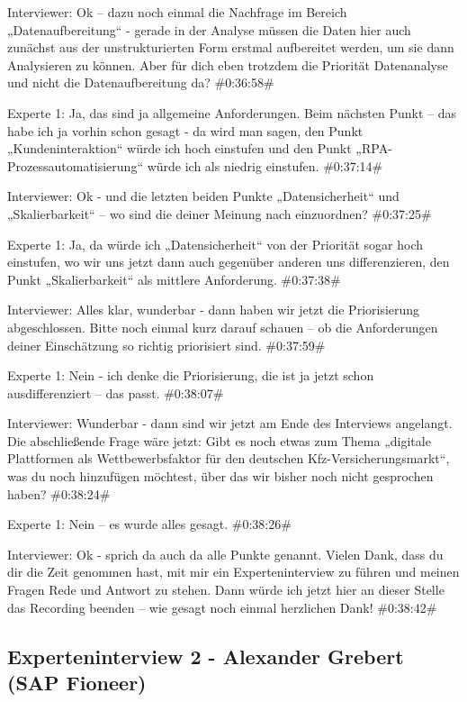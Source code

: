 Interviewer:
Ok – dazu noch einmal die Nachfrage im Bereich „Datenaufbereitung“ - gerade in der Analyse müssen die Daten hier auch zunächst aus der unstrukturierten Form erstmal aufbereitet werden, um sie dann Analysieren zu können. Aber für dich eben trotzdem die Priorität Datenanalyse und nicht die Datenaufbereitung da?
\#0:36:58\#

Experte 1:
Ja, das sind ja allgemeine Anforderungen. Beim nächsten Punkt – das habe ich ja vorhin schon gesagt - da wird man sagen, den Punkt „Kundeninteraktion“ würde ich hoch einstufen und den Punkt „RPA-Prozessautomatisierung“ würde ich als niedrig einstufen.
\#0:37:14\#

Interviewer:
Ok - und die letzten beiden Punkte „Datensicherheit“ und „Skalierbarkeit“ – wo sind die deiner Meinung nach einzuordnen?
\#0:37:25\#

Experte 1:
Ja, da würde ich „Datensicherheit“ von der Priorität sogar hoch einstufen, wo wir uns jetzt dann auch gegenüber anderen uns differenzieren, den Punkt „Skalierbarkeit“ als mittlere Anforderung.
\#0:37:38\#

Interviewer:
Alles klar, wunderbar - dann haben wir jetzt die Priorisierung abgeschlossen. Bitte noch einmal kurz darauf schauen – ob die Anforderungen deiner Einschätzung so richtig priorisiert sind.
\#0:37:59\#

Experte 1:
Nein - ich denke die Priorisierung, die ist ja jetzt schon ausdifferenziert – das passt.
\#0:38:07\#

Interviewer:
Wunderbar - dann sind wir jetzt am Ende des Interviews angelangt. Die abschließende Frage wäre jetzt: Gibt es noch etwas zum Thema „digitale Plattformen als Wettbewerbsfaktor für den deutschen Kfz-Versicherungsmarkt“, was du noch hinzufügen möchtest, über das wir bisher noch nicht gesprochen haben?
\#0:38:24\#

Experte 1:
Nein – es wurde alles gesagt.
\#0:38:26\#

Interviewer:
Ok -  sprich da auch da alle Punkte genannt. Vielen Dank, dass du dir die Zeit genommen hast, mit mir ein Experteninterview zu führen und meinen Fragen Rede und Antwort zu stehen. Dann würde ich jetzt hier an dieser Stelle das Recording beenden – wie gesagt noch einmal herzlichen Dank!
\#0:38:42\#


\newpage

\subsection{Experteninterview 2 - Alexander Grebert (SAP Fioneer)}

